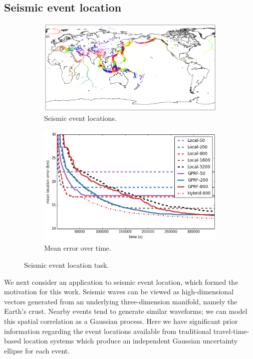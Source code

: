 \documentclass{article}
\begin{document}
\subsection{Seismic event location}
 \begin{figure}
 \centering
  \begin{subfigure}[t]{.50\textwidth}
                  \includegraphics[width=\textwidth]{seismic_X}
                  \caption{Seismic event locations.}
                  \label{fig:seismicX}
          \end{subfigure}\hspace{0.5em}
  \begin{subfigure}[t]{.40\textwidth}
                  \includegraphics[width=\textwidth]{seismic_xcov_small}
                  \caption{Mean error over time.}
                  \label{fig:seismicresults}
          \end{subfigure}
 \caption{Seismic event location task.}
 \label{fig:seismic}
 \end{figure}

We next consider an application to seismic event location, which formed the
motivation for this work. Seismic waves can be
viewed as high-dimensional vectors generated from an
underlying three-dimension manifold, namely the Earth's
crust. Nearby events tend to generate similar waveforms; we
can model this spatial correlation as a Gaussian process. Here we have significant prior information regarding the event
locations available from traditional travel-time-based location systems
\cite{ISCcitation2015} which produce an independent Gaussian uncertainty ellipse for each event.
\end{document}
